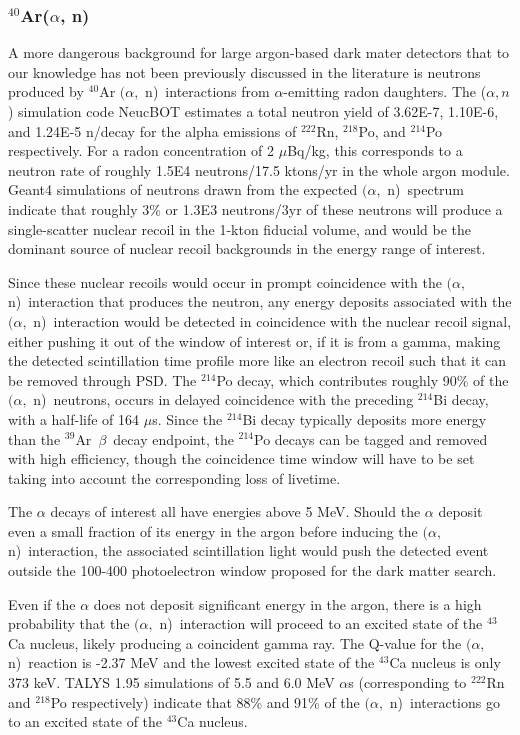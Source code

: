 \documentclass[a4paper,11pt]{article}
\newcommand{\artn}{$^{39}$Ar}
\newcommand{\alphan}{$(\alpha,$ n)}
\begin{document}
\subsubsection{$^{40}$Ar($\alpha$, n)}
A more dangerous background for large argon-based dark mater detectors that to our knowledge has not been previously discussed in the literature is neutrons produced by $^{40}$Ar \alphan~interactions from $\alpha$-emitting radon daughters. The ($\alpha,n$) simulation code NeucBOT \cite{westerdale2017radiogenic} estimates a total neutron yield of \num{3.62E-7}, \num{1.10E-6}, and \num{1.24E-5} n/decay for the alpha emissions of $^{222}$Rn, $^{218}$Po, and $^{214}$Po respectively. For a radon concentration of 2 $\mu$Bq/kg, this corresponds to a neutron rate of roughly \num{1.5E4} neutrons/17.5 ktons/yr in the whole argon module. Geant4 simulations of neutrons drawn from the expected \alphan~spectrum indicate that roughly 3\% or \num{1.3E3} neutrons/3yr of these neutrons will produce a single-scatter nuclear recoil in the 1-kton fiducial volume, and would be the dominant source of nuclear recoil backgrounds in the energy range of interest.

Since these nuclear recoils would occur in prompt coincidence with the \alphan~interaction that produces the neutron, any energy deposits associated with the \alphan~interaction would be detected in coincidence with the nuclear recoil signal, either pushing it out of the window of interest or, if it is from a gamma, making the detected scintillation time profile more like an electron recoil such that it can be removed through PSD. 
The $^{214}$Po decay, which contributes roughly 90\% of the \alphan~neutrons, occurs in delayed coincidence with the preceding $^{214}$Bi decay, with a half-life of 164 $\mu$s. Since the $^{214}$Bi decay typically deposits more energy than the \artn~$\beta$~decay endpoint, the $^{214}$Po decays can be tagged and removed with high efficiency, though the coincidence time window will have to be set taking into account the corresponding loss of livetime.

The $\alpha$ decays of interest all have energies above 5 MeV. Should the $\alpha$ deposit even a small fraction of its energy in the argon before inducing the \alphan~interaction, the associated scintillation light would push the detected event outside the 100-400 photoelectron window proposed for the dark matter search. 

Even if the $\alpha$ does not deposit significant energy in the argon, there is a high probability that the \alphan~interaction will proceed to an excited state of the $^{43}$Ca nucleus, likely producing a coincident gamma ray. The Q-value for the \alphan~reaction is -2.37 MeV and the lowest excited state of the $^{43}$Ca nucleus is only 373 keV. TALYS 1.95 \cite{koning2007talys} simulations of 5.5 and 6.0 MeV $\alpha$s (corresponding to $^{222}$Rn and $^{218}$Po respectively) indicate that 88\% and 91\% of the \alphan~interactions go to an excited state of the $^{43}$Ca nucleus. 
\end{document}
